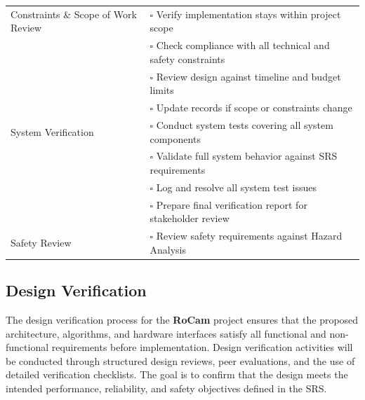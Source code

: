 \documentclass[12pt, titlepage]{article}
\begin{document}
\begin{table}[H]
\begin{tabular}{|p{4.4cm}|p{10.1cm}|}
    Constraints \& Scope of Work Review             & $\square$ \; Verify implementation stays
    within project scope                                                                                                                            \\[-2pt]
                                                    & $\square$ \; Check compliance with all technical and safety constraints                       \\[-2pt]
                                                    & $\square$ \; Review design against timeline and budget limits                                 \\[-2pt]
                                                    & $\square$ \; Update records if scope or constraints change                                    \\ \hline

    System Verification                             & $\square$ \; Conduct system tests covering all system
    components                                                                                                                                      \\[-2pt]
                                                    & $\square$ \; Validate full system behavior against SRS requirements                           \\[-2pt]
                                                    & $\square$ \; Log and resolve all system test issues                                           \\[-2pt]
                                                    & $\square$ \; Prepare final verification report for stakeholder review                         \\ \hline

    Safety Review                                   & $\square$ \; Review safety requirements against Hazard Analysis
    \\ \hline
  \end{tabular}
\end{table}

\subsection{Design Verification}

The design verification process for the \textbf{RoCam} project ensures that the
proposed architecture, algorithms, and hardware interfaces satisfy all
functional and non-functional requirements before implementation. Design
verification activities will be conducted through structured design reviews,
peer evaluations, and the use of detailed verification checklists. The goal is
to confirm that the design meets the intended performance, reliability, and
safety objectives defined in the SRS.
\end{document}
